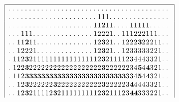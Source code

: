         \begin{figure}
        \tiny
        $$
\begin{tabular}{|p{2mm}@{}p{2mm}@{}p{2mm}@{}p{2mm}@{}p{2mm}@{}p{2mm}@{}p{2mm}@{}p{2mm}@{}p{2mm}@{}p{2mm}@{}p{2mm}@{}p{2mm}@{}p{2mm}@{}p{2mm}@{}p{2mm}@{}p{2mm}@{}p{2mm}@{}p{2mm}@{}p{2mm}@{}p{2mm}@{}p{2mm}@{}p{2mm}@{}p{2mm}@{}p{2mm}@{}p{2mm}@{}p{2mm}@{}p{2mm}@{}p{2mm}@{}p{2mm}@{}p{2mm}@{}p{2mm}@{}p{2mm}@{}p{2mm}@{}p{2mm}@{}p{2mm}@{}p{2mm}@{}p{2mm}@{}p{2mm}@{}p{2mm}@{}p{2mm}|}\hline
.& .& .& .& .& .& .& .& .& .& .& .& .& .& .& .& .& .& .& .& .& .& .& .& .& .& .& .& .& .& .& .& .& .& .& .& .& .& .& .\\
.& .& .& .& .& .& .& .& .& .& .& .& .& .& .& .& .& .& .& .& .& .& 1& 1& 1& .& .& .& .& .& .& .& .& .& .& .& .& .& .& .\\
.& .& .& .& .& .& .& .& .& .& .& .& .& .& .& .& .& .& .& .& .& 1& 1&\textbf{2}& 1& 1& .& .& .& .& 1& 1& 1& 1& 1& .& .& .& .& .\\
.& .& .& 1& 1& 1& .& .& .& .& .& .& .& .& .& .& .& .& .& .& .& 1& 2& 2& 2& 1& .& .& 1& 1& 1& 2& 2& 2& 1& 1& 1& .& .& .\\
.& .& 1& 1&\textbf{2}& 1& 1& .& .& .& .& .& .& .& .& .& .& .& .& .& .& 1& 2&\textbf{3}& 2& 1& .& .& 1& 2& 2& 2&\textbf{3}& 2& 2& 2& 1& 1& .& .\\
.& .& 1& 2& 2& 2& 1& .& .& .& .& .& .& .& .& .& .& .& .& .& .& 1& 2&\textbf{3}& 2& 1& .& .& 1& 2& 3& 3& 3& 3& 3& 2& 2& 1& .& .\\
.& 1& 1& 2&\textbf{3}& 2& 1& 1& 1& 1& 1& 1& 1& 1& 1& 1& 1& 1& 1& 1& 1& 1& 2&\textbf{3}& 2& 1& 1& 1& 1& 2& 3& 4& 4& 4& 3& 3& 2& 1& .& .\\
.& 1& 2& 2&\textbf{3}& 2& 2& 2& 2& 2& 2& 2& 2& 2& 2& 2& 2& 2& 2& 2& 2& 2& 2&\textbf{3}& 2& 2& 2& 2& 2& 2& 3& 4&\textbf{5}& 4&\textbf{4}& 3& 2& 1& .& .\\
.& 1& 1& 2&\textbf{3}&\textbf{3}&\textbf{3}&\textbf{3}&\textbf{3}&\textbf{3}&\textbf{3}&\textbf{3}&\textbf{3}&\textbf{3}&\textbf{3}&\textbf{3}&\textbf{3}&\textbf{3}&\textbf{3}&\textbf{3}&\textbf{3}&\textbf{3}&\textbf{3}&\textbf{3}&\textbf{3}&\textbf{3}&\textbf{3}&\textbf{3}&\textbf{3}& 3& 3& 4&\textbf{5}& 4&\textbf{4}& 3& 2& 1& .& .\\
.& .& 1& 2&\textbf{3}& 2& 2& 2& 2& 2& 2&\textbf{3}& 2& 2& 2& 2& 2& 2& 2& 2& 2& 2& 2&\textbf{3}& 2& 2& 2& 2& 2& 3&\textbf{4}& 4& 4& 4& 3& 3& 2& 1& .& .\\
.& .& 1& 2&\textbf{3}& 2& 1& 1& 1& 1& 2&\textbf{3}& 2& 1& 1& 1& 1& 1& 1& 1& 1& 1& 2&\textbf{3}& 2& 1& 1& 1& 2& 3&\textbf{4}& \textbf{4}& 3& 3& 3& 2& 2& 1& .& .\\

\end{tabular}$$
\end{figure}
